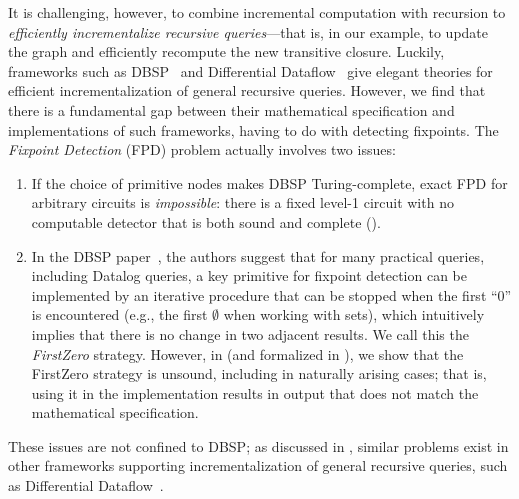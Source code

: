 %
%

%
%
%
%
%
%
%
%
%
%
%
%

It is challenging, however, to combine incremental computation with recursion to \emph{efficiently incrementalize recursive queries}---that is, in our example, to update the graph and efficiently recompute the new transitive closure. Luckily, frameworks such as DBSP~\cite{budiu2025dbsp} and Differential Dataflow~\cite{McSherry2013DifferentialD} give elegant theories for efficient incrementalization of general recursive queries.
However, we find that there is a fundamental gap between their mathematical specification and implementations of such frameworks, having to do with detecting fixpoints.
The \emph{Fixpoint Detection} (FPD) problem actually involves two issues:
\begin{enumerate}
  \item
    \label{It:FPDUndecidability}
    If the choice of primitive nodes makes DBSP Turing-complete, exact FPD for arbitrary circuits is \emph{impossible}: there is a fixed level-1 circuit with no computable detector that is both sound and complete ().
  \item
    \label{It:FirstZeroUnsound}
    In the DBSP paper~\cite{budiu2025dbsp}, the authors suggest that for many practical queries, including Datalog queries, a key primitive for fixpoint detection can be implemented by an iterative procedure that can be stopped when the first ``$0$'' is encountered (e.g., the first $\emptyset$ when working with sets), which intuitively implies that there is no change in two adjacent results.
    We call this the \emph{FirstZero} strategy.
    However, in  (and formalized in
        ), we show that the FirstZero strategy is
        unsound, including in naturally arising cases; that is, using it in the
        implementation results in output that does not match the mathematical specification.
\end{enumerate}

These issues are not confined to DBSP;
as discussed in , similar problems exist in other frameworks supporting incrementalization of general recursive queries, such as Differential Dataflow~\cite{McSherry2013DifferentialD}.

%
%
%
%
%
%
%
%
%
%

%
%
%

